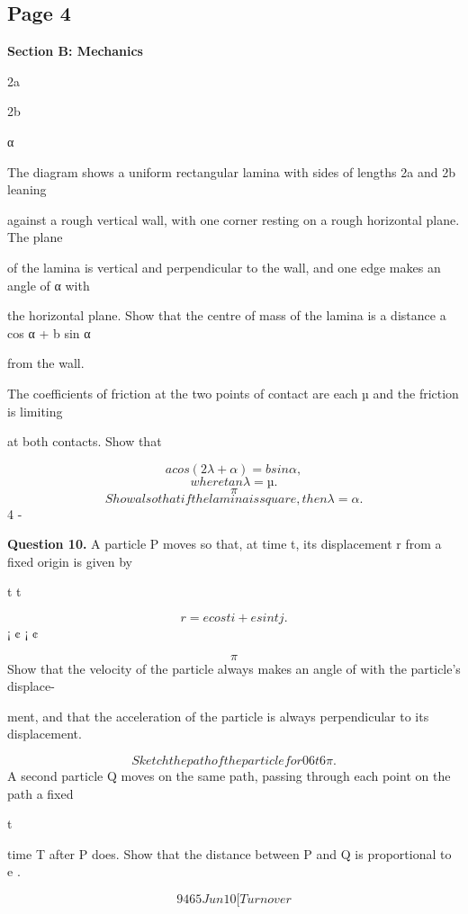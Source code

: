 \documentclass[12pt]{article}
\begin{document}
\subsection*{Page 4}
\begin{flushleft}
\bigskip\textbf{Section B: Mechanics}\par
2a\par
2b\par
α\par
The diagram shows a uniform rectangular lamina with sides of lengths 2a and 2b leaning\par
against a rough vertical wall, with one corner resting on a rough horizontal plane. The plane\par
of the lamina is vertical and perpendicular to the wall, and one edge makes an angle of α with\par
the horizontal plane. Show that the centre of mass of the lamina is a distance a cos α + b sin α\par
from the wall.\par
The coefficients of friction at the two points of contact are each µ and the friction is limiting\par
at both contacts. Show that\par
\[a cos(2λ + α) = b sin α ,\]
\[where tan λ = µ.\]
\[\pi\]
\[Show also that if the lamina is square, then λ = α.\]
4 -\par
\bigskip\textbf{Question 10.} A particle P moves so that, at time t, its displacement r from a fixed origin is given by\par
t t\par
\[r = e cos t i + e sin t j .\]
¡ ¢ ¡ ¢\par
\[\pi\]
Show that the velocity of the particle always makes an angle of with the particle's displace-\par
ment, and that the acceleration of the particle is always perpendicular to its displacement.\par
\[Sketch the path of the particle for 0 6 t 6 \pi.\]
A second particle Q moves on the same path, passing through each point on the path a fixed\par
t\par
time T after P does. Show that the distance between P and Q is proportional to e .\par
\[9465 Jun10 [Turn over\]
\end{flushleft}
\end{document}
